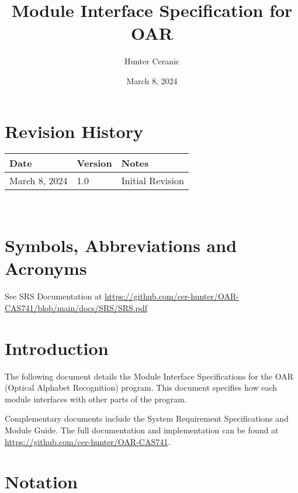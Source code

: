 \documentclass[12pt, titlepage]{article}
\begin{document}
\title{Module Interface Specification for OAR}

\author{Hunter Ceranic}

\date{March 8, 2024}

\maketitle


\section{Revision History}

\begin{tabularx}{\textwidth}{p{3cm}p{2cm}X}
\toprule {\bf Date} & {\bf Version} & {\bf Notes}\\
\midrule
March 8, 2024 & 1.0 & Initial Revision\\
\bottomrule
\end{tabularx}

~\newpage

\section{Symbols, Abbreviations and Acronyms}

See SRS Documentation \citep{SRS} at \url{https://github.com/cer-hunter/OAR-CAS741/blob/main/docs/SRS/SRS.pdf}


\newpage

\tableofcontents

\newpage


\section{Introduction}

The following document details the Module Interface Specifications for
the OAR (Optical Alphabet Recognition) program. This document specifies how each module
interfaces with other parts of the program.

Complementary documents include the System Requirement Specifications
and Module Guide.  The full documentation and implementation can be
found at \url{https://github.com/cer-hunter/OAR-CAS741}. 

\section{Notation}
\end{document}
